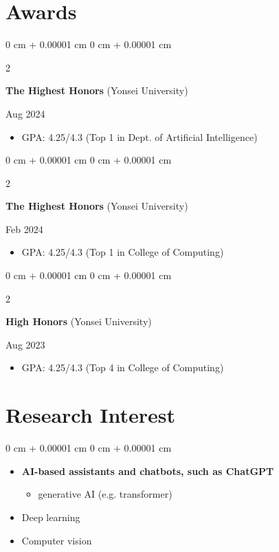 \documentclass[10pt, letterpaper]{article}
\newenvironment{highlights}{
    \begin{itemize}[
        topsep=0.10 cm,
        parsep=0.10 cm,
        partopsep=0pt,
        itemsep=0pt,
        leftmargin=0 cm + 10pt
    ]
}{
    \end{itemize}
} %
\newenvironment{onecolentry}{
    \begin{adjustwidth}{
        0 cm + 0.00001 cm
    }{
        0 cm + 0.00001 cm
    }
}{
    \end{adjustwidth}
} %
\newenvironment{twocolentry}[2][]{
    \onecolentry
    \def\secondColumn{#2}
    \setcolumnwidth{\fill, 4.5 cm}
    \begin{paracol}{2}
}{
    \switchcolumn \raggedleft \secondColumn
    \end{paracol}
    \endonecolentry
} %
\begin{document}
    \section{Awards}
        \begin{twocolentry}{
            Aug 2024
        }
            \textbf{The Highest Honors} (Yonsei University)
        \end{twocolentry}
        \begin{highlights}
            \item GPA: 4.25/4.3 (Top 1 in Dept. of Artificial Intelligence)
        \end{highlights}
        \vspace{0.10 cm}
        \begin{twocolentry}{
            Feb 2024
        }
            \textbf{The Highest Honors} (Yonsei University)
        \end{twocolentry}
        \begin{highlights}
            \item GPA: 4.25/4.3 (Top 1 in College of Computing)
        \end{highlights}
        \vspace{0.10 cm}
        \begin{twocolentry}{
            Aug 2023
        }
            \textbf{High Honors} (Yonsei University)
        \end{twocolentry}
        \begin{highlights}
            \item GPA: 4.25/4.3 (Top 4 in College of Computing)
        \end{highlights}
        \vspace{0.10 cm}

    \section{Research Interest}
        \begin{onecolentry}
            \begin{highlights}
                \item \textbf{AI-based assistants and chatbots, such as ChatGPT}
                \begin{itemize}
                    \item generative AI (e.g. transformer)
                \end{itemize}
                \item Deep learning
                \item Computer vision
            \end{highlights}
        \end{onecolentry}
\end{document}
